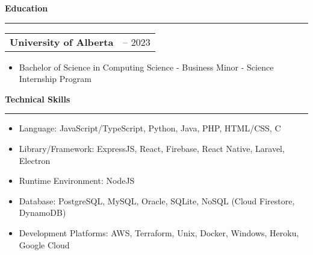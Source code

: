 \documentclass[11pt]{article}
\newenvironment{compactList}
{
  \begin{itemize}
    \setlength{\itemsep}{0pt}
    \setlength{\parskip}{0pt}
}
{\end{itemize}}
\begin{document}
\begin{center}
  \textbf{Education}
  \noindent\rule[10pt]{0.9\paperwidth}{0.4pt}
\end{center}
\vspace{-20pt}
\begin{tabularx}{\textwidth}
  {
    >{\raggedright\arraybackslash}X
    >{\raggedleft\arraybackslash}X
  }
  \textbf{University of Alberta} & 2017 – 2023 \\
\end{tabularx}
\vspace{-20pt}
\begin{itemize}
  \item Bachelor of Science in Computing Science - Business Minor - Science Internship Program
\end{itemize}
\vspace{-15pt}

\begin{center}
  \textbf{Technical Skills}
  \noindent\rule[10pt]{0.9\paperwidth}{0.4pt}
\end{center}
\vspace{-30pt}
\begin{compactList}
  \item Language: JavaScript/TypeScript, Python, Java, PHP, HTML/CSS, C
  \item Library/Framework: ExpressJS, React, Firebase, React Native, Laravel, Electron
  \item Runtime Environment: NodeJS
  \item Database: PostgreSQL, MySQL, Oracle, SQLite, NoSQL (Cloud Firestore, DynamoDB)
  \item Development Platforms: AWS, Terraform, Unix, Docker, Windows, Heroku, Google Cloud
\end{compactList}
\vspace{-15pt}
\end{document}
